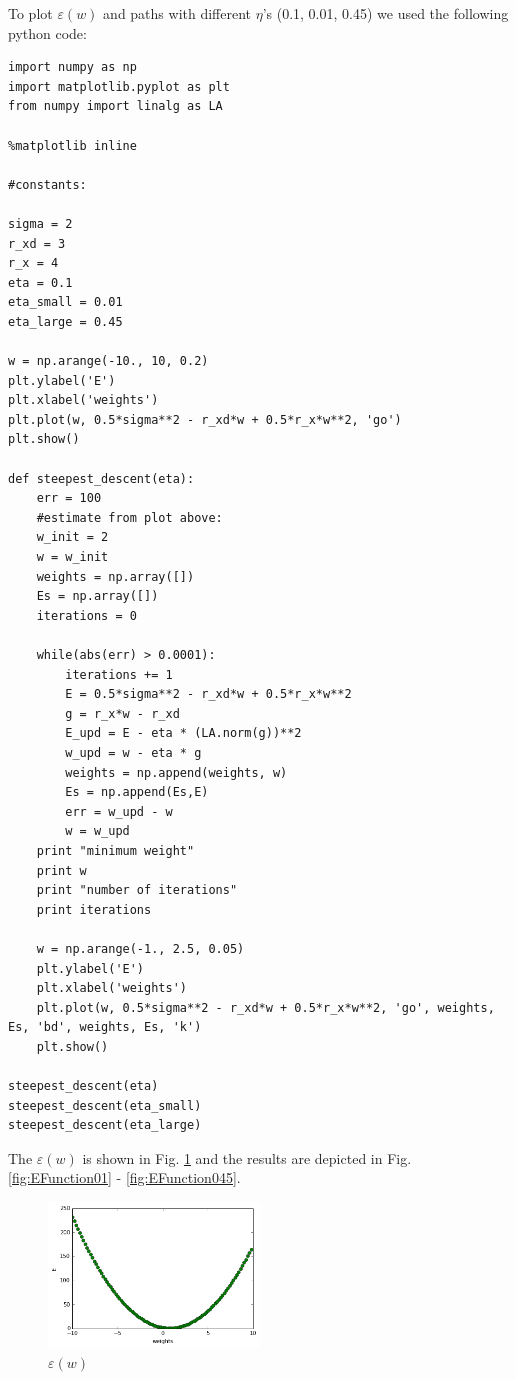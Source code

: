 \documentclass[a4paper, 12pt]{article}
\begin{document}
To plot $\varepsilon(w)$ and paths with different $\eta$'s (0.1, 0.01, 0.45) we used the following python code:

\lstset{language=Python}
\begin{lstlisting}[frame=single]
import numpy as np
import matplotlib.pyplot as plt
from numpy import linalg as LA

%matplotlib inline

#constants:

sigma = 2
r_xd = 3
r_x = 4
eta = 0.1
eta_small = 0.01
eta_large = 0.45

w = np.arange(-10., 10, 0.2)
plt.ylabel('E')
plt.xlabel('weights')
plt.plot(w, 0.5*sigma**2 - r_xd*w + 0.5*r_x*w**2, 'go')
plt.show()

def steepest_descent(eta):
    err = 100
    #estimate from plot above:
    w_init = 2
    w = w_init
    weights = np.array([])
    Es = np.array([])
    iterations = 0

    while(abs(err) > 0.0001):
        iterations += 1
        E = 0.5*sigma**2 - r_xd*w + 0.5*r_x*w**2
        g = r_x*w - r_xd
        E_upd = E - eta * (LA.norm(g))**2
        w_upd = w - eta * g
        weights = np.append(weights, w)
        Es = np.append(Es,E)
        err = w_upd - w
        w = w_upd
    print "minimum weight"
    print w
    print "number of iterations"
    print iterations

    w = np.arange(-1., 2.5, 0.05)
    plt.ylabel('E')
    plt.xlabel('weights')
    plt.plot(w, 0.5*sigma**2 - r_xd*w + 0.5*r_x*w**2, 'go', weights, Es, 'bd', weights, Es, 'k')
    plt.show()

steepest_descent(eta)
steepest_descent(eta_small)
steepest_descent(eta_large)
\end{lstlisting}

The $\varepsilon(w)$ is shown in Fig. \ref{fig:EFunction} and the results are depicted in Fig.\ref{fig:EFunction01} - \ref{fig:EFunction045}.

\begin{figure}[h]
  \centering
  \caption{$\varepsilon(w)$ \label{fig:EFunction}}
  \includegraphics[width=0.5\textwidth]{EFunction}
\end{figure}
\end{document}
